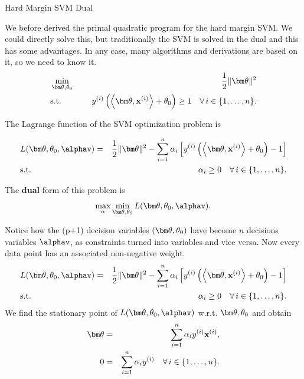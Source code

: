\documentclass[11pt,compress,t,notes=noshow, xcolor=table]{beamer}
\begin{document}
\begin{vbframe}{Hard Margin SVM Dual}

We before derived the primal quadratic program for the hard margin SVM. We could directly solve this, but traditionally the SVM is solved in the dual and this has some advantages. In any case, many algorithms and derivations are based on it, so we need to know it.
  \begin{eqnarray*}
  & \min\limits_{\thetav, \theta_0} \quad & \frac{1}{2} \|\thetav\|^2 \\
  & \text{s.t.} & \,\,\yi  \left( \scp{\thetav}{\xi} + \theta_0 \right) \geq 1 \quad \forall\, i \in \nset.
\end{eqnarray*}







The Lagrange function of the SVM optimization problem is

\vspace*{-.5cm}

\small
\begin{eqnarray*}
&L(\thetav, \theta_0, \alphav) = & \frac{1}{2}\|\thetav\|^2  -  \sum_{i=1}^n \alpha_i \left[\yi  \left( \scp{\thetav}{\xi} + \theta_0 \right) - 1\right]\\
 & \text{s.t.} & \,\, \alpha_i \ge 0 \quad \forall\, i \in \nset.
\end{eqnarray*}
\small

The \textbf{dual} form of this problem is
$$\max\limits_{\alpha} \min\limits_{\thetav, \theta_0}  L(\thetav, \theta_0,\alphav).$$

\framebreak 

Notice how the (p+1) decision variables $(\thetav,\theta_0)$ have become $n$ decisions variables $\alphav$, as constraints turned into variables and vice versa.
Now every data point has an associated non-negative weight.
\begin{eqnarray*}
&L(\thetav, \theta_0, \alphav) = & \frac{1}{2}\|\thetav\|^2  -  \sum_{i=1}^n \alpha_i \left[\yi  \left( \scp{\thetav}{\xi} + \theta_0 \right) - 1\right]\\
 & \text{s.t.} & \,\, \alpha_i \ge 0 \quad \forall\, i \in \nset.
\end{eqnarray*}
We find the stationary point of $L(\thetav, \theta_0,\alphav)$ w.r.t. $\thetav, \theta_0$ and obtain
\begin{eqnarray*}
    \thetav & = & \sum_{i=1}^n \alpha_i \yi \xi, \\
    0 & = & \sum_{i=1}^n \alpha_i \yi \quad \forall\, i \in \nset.\\
\end{eqnarray*}



\end{vbframe}
\end{document}
